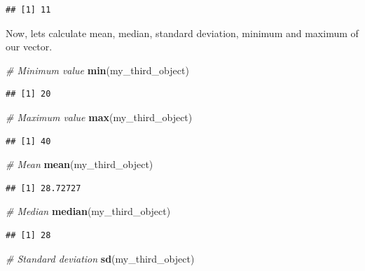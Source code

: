 \documentclass[
]{article}
\newenvironment{Shaded}{\begin{snugshade}}{\end{snugshade}}
\newcommand{\CommentTok}[1]{\textcolor[rgb]{0.56,0.35,0.01}{\textit{#1}}}
\newcommand{\FunctionTok}[1]{\textcolor[rgb]{0.13,0.29,0.53}{\textbf{#1}}}
\newcommand{\NormalTok}[1]{#1}
\begin{document}
\begin{verbatim}
## [1] 11
\end{verbatim}

Now, lets calculate mean, median, standard deviation, minimum and
maximum of our vector.

\begin{Shaded}
\begin{Highlighting}[]
\CommentTok{\# Minimum value}
\FunctionTok{min}\NormalTok{(my\_third\_object)}
\end{Highlighting}
\end{Shaded}

\begin{verbatim}
## [1] 20
\end{verbatim}

\begin{Shaded}
\begin{Highlighting}[]
\CommentTok{\# Maximum value}
\FunctionTok{max}\NormalTok{(my\_third\_object)}
\end{Highlighting}
\end{Shaded}

\begin{verbatim}
## [1] 40
\end{verbatim}

\begin{Shaded}
\begin{Highlighting}[]
\CommentTok{\# Mean}
\FunctionTok{mean}\NormalTok{(my\_third\_object)}
\end{Highlighting}
\end{Shaded}

\begin{verbatim}
## [1] 28.72727
\end{verbatim}

\begin{Shaded}
\begin{Highlighting}[]
\CommentTok{\# Median}
\FunctionTok{median}\NormalTok{(my\_third\_object)}
\end{Highlighting}
\end{Shaded}

\begin{verbatim}
## [1] 28
\end{verbatim}

\begin{Shaded}
\begin{Highlighting}[]
\CommentTok{\# Standard deviation}
\FunctionTok{sd}\NormalTok{(my\_third\_object)}
\end{Highlighting}
\end{Shaded}
\end{document}
